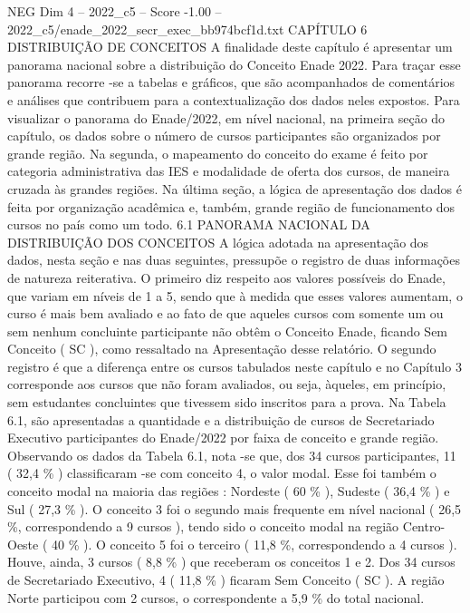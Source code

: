 \begin{textsample}{NEG Dim 4 – 2022\_c5 – Score -1.00 – 2022\_c5/enade\_2022\_secr\_exec\_bb974bcf1d.txt}  \label{ex:f4_neg_072}
CAPÍTULO 6 DISTRIBUIÇÃO DE CONCEITOS A finalidade deste capítulo é apresentar um panorama nacional sobre a distribuição do Conceito Enade 2022.
Para traçar esse panorama recorre -se a tabelas e gráficos, que são acompanhados de comentários e análises que contribuem para a contextualização dos dados neles expostos.
Para visualizar o panorama do Enade/2022, em nível nacional, na primeira seção do capítulo, os dados sobre o número de cursos participantes são organizados por grande região.
Na segunda, o mapeamento do conceito do exame é feito por categoria administrativa das IES e modalidade de oferta dos cursos, de maneira cruzada às grandes regiões.
Na última seção, a lógica de apresentação dos dados é feita por organização acadêmica e, também, grande região de funcionamento dos cursos no país como um todo. 6.1 PANORAMA NACIONAL DA DISTRIBUIÇÃO DOS CONCEITOS A lógica adotada na apresentação dos dados, nesta seção e nas duas seguintes, pressupõe o registro de duas informações de natureza reiterativa.
O primeiro diz respeito aos valores possíveis do Enade, que variam em níveis de 1 a 5, sendo que à medida que esses valores aumentam, o curso é mais bem avaliado e ao fato de que aqueles cursos com somente um ou sem nenhum concluinte participante não obtêm o Conceito Enade, ficando Sem Conceito ( SC ), como ressaltado na Apresentação desse relatório.
O segundo registro é que a diferença entre os cursos tabulados neste capítulo e no Capítulo 3 corresponde aos cursos que não foram avaliados, ou seja, àqueles, em princípio, sem estudantes concluintes que tivessem sido inscritos para a prova.
Na Tabela 6.1, são apresentadas a quantidade e a distribuição de cursos de Secretariado Executivo participantes do Enade/2022 por faixa de conceito e grande região.
Observando os dados da Tabela 6.1, nota -se que, dos 34 cursos participantes, 11 ( 32,4 \% ) classificaram -se com conceito 4, o valor modal.
Esse foi também o conceito modal na maioria das regiões : Nordeste ( 60 \% ), Sudeste ( 36,4 \% ) e Sul ( 27,3 \% ).
O conceito 3 foi o segundo mais frequente em nível nacional ( 26,5 \%, correspondendo a 9 cursos ), tendo sido o conceito modal na região Centro-Oeste ( 40 \% ).
O conceito 5 foi o terceiro ( 11,8 \%, correspondendo a 4 cursos ).
Houve, ainda, 3 cursos ( 8,8 \% ) que receberam os conceitos 1 e 2.
Dos 34 cursos de Secretariado Executivo, 4 ( 11,8 \% ) ficaram Sem Conceito ( SC ).
A região Norte participou com 2 cursos, o correspondente a 5,9 \% do total nacional.

\end{textsample}
